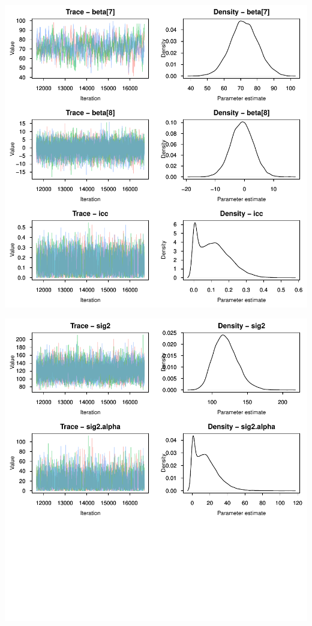 \documentclass{article}\usepackage[]{graphicx}\usepackage[]{color}
\newenvironment{knitrout}{}{} %
\begin{document}
\begin{knitrout}
{}




{\centering \includegraphics[width=.6\linewidth]{figure/FinalRFile-4350-Rnwauto-report-14} 

}




{\centering \includegraphics[width=.6\linewidth]{figure/FinalRFile-4350-Rnwauto-report-15} 

}



\end{knitrout}
\end{document}
